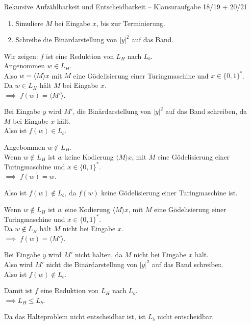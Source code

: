 \documentclass[answers]{submit}
\begin{document}
\begin{exercise}[6]{Rekursive Aufzählbarkeit und Entscheidbarkeit -- Klausuraufgabe 18/19 + 20/21}
{    \begin{enumerate}
      \item Simuliere $M$ bei Eingabe $x$, bis zur Terminierung.
      \item Schreibe die Binärdarstellung von $|y|^2$ auf das Band.
    \end{enumerate}

    Wir zeigen: $f$ ist eine Reduktion von $L_H$ nach $L_b$.\\

    Angenommen $w \in L_H$.\\

    Also $w = \langle M \rangle x$ mit $M$ eine Gödelisierung einer Turingmaschine und $x \in \{0,1\}^*$.\\

    Da $w \in L_H$ hält $M$ bei Eingabe $x$.\\

    $\implies$ $f(w) = \langle M' \rangle$.

    Bei Eingabe $y$ wird $M'$, die Binärdarstellung von $|y|^2$ auf das Band schreiben, da $M$ bei Eingabe $x$ hält.\\

    Also ist $f(w) \in L_b$.

    Angebommen $w \notin L_H$.\\

    Wenn $w \notin L_H$ ist $w$ keine Kodierung $ \langle M \rangle x$, mit $M$ eine Gödelisierung einer Turingmaschine und $x \in \{0,1\}^*$.\\

    $\implies$ $f(w) = w$.

    Also ist $f(w) \notin L_b$, da $f(w)$ keine Gödelisierung einer Turingmaschine ist.

    Wenn $w \notin L_H$ ist $w$ eine Kodierung $ \langle M \rangle x$, mit $M$ eine Gödelisierung einer Turingmaschine und $x \in \{0,1\}^*$.\\

    Da $w \notin L_H$ hält $M$ nicht bei Eingabe $x$.\\

    $\implies$ $f(w) = \langle M' \rangle$.

    Bei Eingabe $y$ wird $M'$ nicht halten, da $M$ nicht bei Eingabe $x$ hält.\\

    Also wird $M'$ nicht die Binärdarstellung von $|y|^2$ auf das Band schreiben.\\

    Also ist $f(w) \notin L_b$.

    Damit ist $f$ eine Reduktion von $L_H$ nach $L_b$.\\

    $\implies L_H \leq L_b$.

    Da das Halteproblem nicht entscheidbar ist, ist $L_b$ nicht entscheidbar.\\
  }
\end{exercise}
\end{document}
